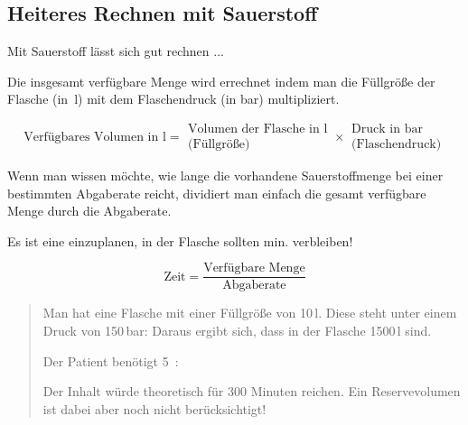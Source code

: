 \subsection{Heiteres Rechnen mit Sauerstoff}

Mit Sauerstoff lässt sich gut rechnen ...

Die insgesamt verfügbare Menge wird errechnet indem man
die Füllgröße der Flasche (in~l) mit dem
Flaschendruck (in bar) multipliziert.

\begin{equation}
\mbox{Verfügbares Volumen in l} = {\begin{array}{c}
\mbox{Volumen der Flasche in l}\\
\mbox{(Füllgröße)} \end{array}}
\times 
\begin{array}{c}{\mbox{Druck in bar}}\\
\mbox{(Flaschendruck)}
\end{array}
\end{equation}




Wenn man wissen möchte, wie lange die vorhandene Sauerstoffmenge bei
einer bestimmten Abgaberate reicht, dividiert man einfach
die gesamt verfügbare Menge durch die Abgaberate. 

 Es ist eine 
einzuplanen, in der Flasche sollten min.  verbleiben! 


\begin{equation}
\mbox{Zeit} = \frac{\mbox{Verfügbare
Menge}}{\mbox{Abgaberate}}
\end{equation}





\begin{quote}
Man hat eine Flasche mit einer Füllgröße von 10\,l. Diese
steht unter einem Druck von 150\,bar: Daraus ergibt
sich, dass in der Flasche 1500\,l  sind.

Der Patient benötigt 5\,  : 

Der Inhalt würde theoretisch für 300 Minuten reichen. Ein
Reservevolumen ist dabei aber noch nicht berücksichtigt!
\end{quote}

